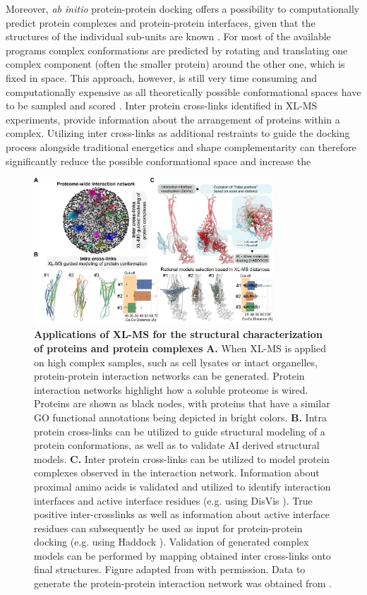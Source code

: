 Moreover, \emph{ab initio} protein-protein docking offers a possibility to computationally predict protein complexes and protein-protein interfaces, given that the structures of the individual sub-units are known \cite{Dominguez_2003, Vakser_2014}. For most of the available programs complex conformations are predicted by rotating and translating one complex component (often the smaller protein) around the other one, which is fixed in space. This approach, however, is still very time consuming and computationally expensive as all theoretically possible conformational spaces have to be sampled and scored \cite{Dominguez_2003, van_Zundert_2016}. Inter protein cross-links identified in XL-MS experiments, provide information about the arrangement of proteins within a complex. Utilizing inter cross-links as additional restraints to guide the docking process alongside traditional energetics and shape complementarity can therefore significantly reduce the possible conformational space and increase the 

\begin{figure}[hbt!]
    \center
    \includegraphics[width=0.8\textwidth]{Chapter.1/Figures/Figure4.png} 
    \caption{\textbf{Applications of XL-MS for the structural characterization of proteins and protein complexes} \textbf{A.} When XL-MS is applied on high complex samples, such as cell lysates or intact organelles, protein-protein interaction networks can be generated. Protein interaction networks highlight how a soluble proteome is wired. Proteins are shown as black nodes, with proteins that have a similar GO functional annotations \cite{Ashburner_2000} being depicted in bright colors. \textbf{B.} Intra protein cross-links can be utilized to guide structural modeling of a protein conformations, as well as to validate AI derived structural models. \textbf{C.} Inter protein cross-links can be utilized to model protein complexes observed in the interaction network. Information about proximal amino acids is validated and utilized to identify interaction interfaces and active interface residues (e.g. using DisVis \cite{van_Zundert_2015}). True positive inter-crosslinks as well as information about active interface residues can subsequently be used as input for protein-protein docking (e.g. using Haddock \cite{van_Zundert_2016}). Validation of generated complex models can be performed by mapping obtained inter cross-links onto final structures. Figure adapted from \cite{Lagerwaard_2022} with permission. Data to generate the protein-protein interaction network was obtained from \cite{Costanzo_2016}.}
    \label{fig:fig4}
\end{figure}

